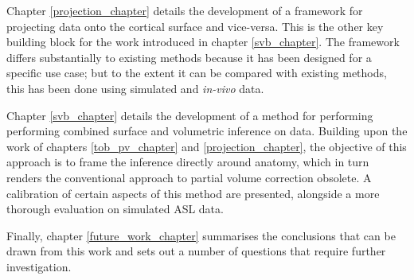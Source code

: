 Chapter \ref{projection_chapter} details the development of a framework for projecting data onto the cortical surface and vice-versa. This is the other key building block for the work introduced in chapter \ref{svb_chapter}. The framework differs substantially to existing methods because it has been designed for a specific use case; but to the extent it can be compared with existing methods, this has been done using simulated and \textit{in-vivo} data. 

Chapter \ref{svb_chapter} details the development of a method for performing performing combined surface and volumetric inference on data. Building upon the work of chapters \ref{tob_pv_chapter} and \ref{projection_chapter}, the objective of this approach is to frame the inference directly around anatomy, which in turn renders the conventional approach to partial volume correction obsolete. A calibration of certain aspects of this method are presented, alongside a more thorough evaluation on simulated ASL data. 

Finally, chapter \ref{future_work_chapter} summarises the conclusions that can be drawn from this work and sets out a number of questions that require further investigation. 



